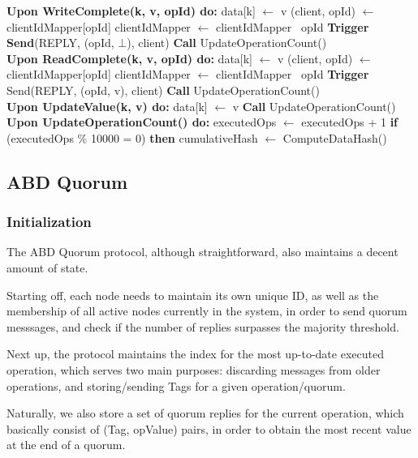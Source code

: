 \documentclass[sigconf]{acmart}
\begin{document}
\begin{algorithmic}[1]
\State \textbf{Upon WriteComplete(k, v, opId) do:}
\State \quad data[k] $\gets$ v
\State \quad (client, opId) $\gets$ clientIdMapper[opId]
\State \quad clientIdMapper $\gets$ clientIdMapper \ opId
\State \quad \textbf{Trigger Send}(REPLY, (opId, $\bot$), client)
\State \quad \textbf{Call} UpdateOperationCount() \\

\State \textbf{Upon ReadComplete(k, v, opId) do:}
\State \quad data[k] $\gets$ v
\State \quad (client, opId) $\gets$ clientIdMapper[opId]
\State \quad clientIdMapper $\gets$ clientIdMapper \ opId
\State \quad \textbf{Trigger} Send(REPLY, (opId, v), client)
\State \quad \textbf{Call} UpdateOperationCount() \\

\State \textbf{Upon UpdateValue(k, v) do:}
\State \quad data[k] $\gets$ v
\State \quad \textbf{Call} UpdateOperationCount() \\

\State \textbf{Upon UpdateOperationCount() do:}
\State \quad executedOps $\gets$ executedOps + 1
\State \quad \textbf{if} (executedOps \% 10000 = 0) \textbf{then}
\State \quad \quad cumulativeHash $\gets$ ComputeDataHash() 

\end{algorithmic} 

\subsection{ABD Quorum}

\subsubsection{Initialization}

The ABD Quorum protocol, although straightforward, also maintains a decent amount of state.

Starting off, each node needs to maintain its own unique ID, as well as the membership of all active nodes currently in the system, in order to send quorum messsages, and check if the number of replies surpasses the majority threshold.

Next up, the protocol maintains the index for the most up-to-date executed operation, which serves two main purposes: discarding messages from older operations, and storing/sending Tags for a given operation/quorum.

Naturally, we also store a set of quorum replies for the current operation, which basically consist of (Tag, opValue) pairs, in order to obtain the most recent value at the end of a quorum.
\end{document}
